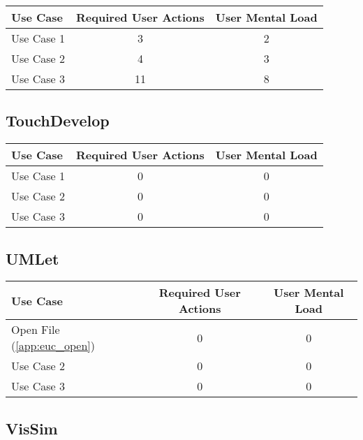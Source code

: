 \begin{tabularx}{\textwidth}{Xcc}
\textbf{Use Case} & \textbf{Required User Actions} & \textbf{User Mental Load}\\
\hline
Use Case 1                          & 3 & 2 \\
Use Case 2                          & 4 & 3 \\
Use Case 3                          & 11 & 8
\end{tabularx}

\subsection*{TouchDevelop}




\begin{tabularx}{\textwidth}{Xcc}
\textbf{Use Case} & \textbf{Required User Actions} & \textbf{User Mental Load}\\
\hline
Use Case 1                          & 0 & 0 \\
Use Case 2                          & 0 & 0 \\
Use Case 3                          & 0 & 0
\end{tabularx}

\subsection*{UMLet}

\begin{tabularx}{\textwidth}{Xcc}
\textbf{Use Case} & \textbf{Required User Actions} & \textbf{User Mental Load}\\
\hline
Open File (\ref{app:euc_open}) & 0 & 0 \\
Use Case 2                     & 0 & 0 \\
Use Case 3                     & 0 & 0
\end{tabularx}

\subsection*{VisSim}

